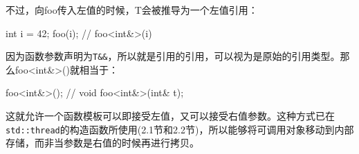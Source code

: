不过，向foo传入左值的时候，T会被推导为一个左值引用：

\begin{cpp}
int i = 42;
foo(i);  // foo<int&>(i)
\end{cpp}

因为函数参数声明为\texttt{T\&\&}，所以就是引用的引用，可以视为是原始的引用类型。那么foo<int\&>()就相当于：

\begin{cpp}
foo<int&>(); // void foo<int&>(int& t);
\end{cpp}

这就允许一个函数模板可以即接受左值，又可以接受右值参数。这种方式已在\texttt{std::thread}的构造函数所使用(2.1节和2.2节)，所以能够将可调用对象移动到内部存储，而非当参数是右值的时候再进行拷贝。